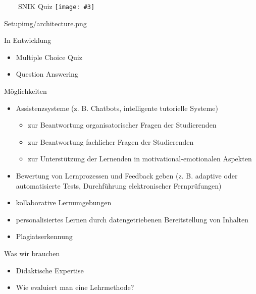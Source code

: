 \documentclass[aspectratio=1610,12pt]{beamer}
\newcommand{\imageslide}[4][]
{
\newgeometry{margin=0cm,top=1em}
\begin{frame}[plain]{~~~~#2}
\vspace{0.2em}
\centering\texttt{[image: \#3]}
\\#1
\note{#4}
\end{frame}
\restoregeometry
}
\begin{document}
{\fi

\imageslide{SNIK Quiz}{img/snik-quiz-screenshot.png}

\imageslide{Setup}{img/architecture.png}

\begin{frame}{In Entwicklung}
\begin{itemize}
\item Multiple Choice Quiz
\item Question Answering
\end{itemize}
\end{frame}

\begin{frame}{Möglichkeiten}
\begin{itemize}
\item Assistenzsysteme (z. B. Chatbots, intelligente tutorielle Systeme)
\begin{itemize}
\item zur Beantwortung organisatorischer Fragen der Studierenden
\item zur Beantwortung fachlicher Fragen der Studierenden
\item zur Unterstützung der Lernenden in motivational-emotionalen Aspekten
\end{itemize}
\item Bewertung von Lernprozessen und Feedback geben (z. B. adaptive oder automatisierte Tests, Durchführung elektronischer Fernprüfungen)
\item kollaborative Lernumgebungen
\item personalisiertes Lernen durch datengetriebenen Bereitstellung von Inhalten
\item Plagiatserkennung 
\end{itemize}
\end{frame}

\begin{frame}{Was wir brauchen}
\begin{itemize}
\item Didaktische Expertise
\item Wie evaluiert man eine Lehrmethode? 
\end{itemize}
\end{frame}


}
\end{document}
